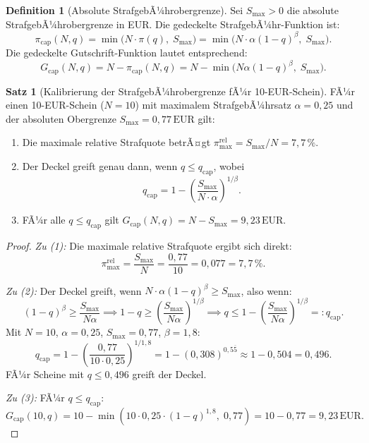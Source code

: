 ﻿\documentclass[a4paper,12pt]{article}
\theoremstyle{definition}
\newtheorem{definition}{Definition}
\newtheorem{satz}{Satz}
\begin{document}
\begin{definition}[Absolute StrafgebÃ¼hrobergrenze]
\label{def:strafdeckel}
Sei $S_{\max} > 0$ die absolute StrafgebÃ¼hrobergrenze in EUR.
Die gedeckelte StrafgebÃ¼hr-Funktion ist:
\[
\pi_{\text{cap}}(N, q) = \min\bigl(N \cdot \pi(q),\; S_{\max}\bigr)
= \min\bigl(N \cdot \alpha(1-q)^{\beta},\; S_{\max}\bigr).
\]
Die gedeckelte Gutschrift-Funktion lautet entsprechend:
\[
G_{\text{cap}}(N, q) = N - \pi_{\text{cap}}(N, q) = N - \min\bigl(N\alpha(1-q)^{\beta},\; S_{\max}\bigr).
\]
\end{definition}

\begin{satz}[Kalibrierung der StrafgebÃ¼hrobergrenze fÃ¼r 10-EUR-Schein]
\label{satz:deckel}
FÃ¼r einen 10-EUR-Schein ($N = 10$) mit maximalem StrafgebÃ¼hrsatz $\alpha = 0{,}25$
und der absoluten Obergrenze $S_{\max} = 0{,}77\,\text{EUR}$ gilt:
\begin{enumerate}
  \item Die maximale relative Strafquote betrÃ¤gt $\pi_{\max}^{\text{rel}} = S_{\max}/N = 7{,}7\,\%$.
  \item Der Deckel greift genau dann, wenn $q \leq q_{\text{cap}}$, wobei
        \[
        q_{\text{cap}} = 1 - \left(\frac{S_{\max}}{N \cdot \alpha}\right)^{1/\beta}.
        \]
  \item FÃ¼r alle $q \leq q_{\text{cap}}$ gilt $G_{\text{cap}}(N,q) = N - S_{\max} = 9{,}23\,\text{EUR}$.
\end{enumerate}
\end{satz}

\begin{proof}
\emph{Zu (1):} Die maximale relative Strafquote ergibt sich direkt:
\[
\pi_{\max}^{\text{rel}} = \frac{S_{\max}}{N} = \frac{0{,}77}{10} = 0{,}077 = 7{,}7\,\%.
\]

\emph{Zu (2):} Der Deckel greift, wenn $N \cdot \alpha(1-q)^{\beta} \geq S_{\max}$,
also wenn:
\[
(1-q)^{\beta} \geq \frac{S_{\max}}{N\alpha}
\implies
1 - q \geq \left(\frac{S_{\max}}{N\alpha}\right)^{1/\beta}
\implies
q \leq 1 - \left(\frac{S_{\max}}{N\alpha}\right)^{1/\beta} =: q_{\text{cap}}.
\]
Mit $N = 10$, $\alpha = 0{,}25$, $S_{\max} = 0{,}77$, $\beta = 1{,}8$:
\[
q_{\text{cap}} = 1 - \left(\frac{0{,}77}{10 \cdot 0{,}25}\right)^{1/1{,}8}
= 1 - (0{,}308)^{0{,}5\overline{5}}
\approx 1 - 0{,}504 = 0{,}496.
\]
FÃ¼r Scheine mit $q \leq 0{,}496$ greift der Deckel.

\emph{Zu (3):} FÃ¼r $q \leq q_{\text{cap}}$:
\[
G_{\text{cap}}(10, q) = 10 - \min(10 \cdot 0{,}25 \cdot (1-q)^{1{,}8},\; 0{,}77)
= 10 - 0{,}77 = 9{,}23\,\text{EUR}.
\]
\end{proof}
\end{document}
